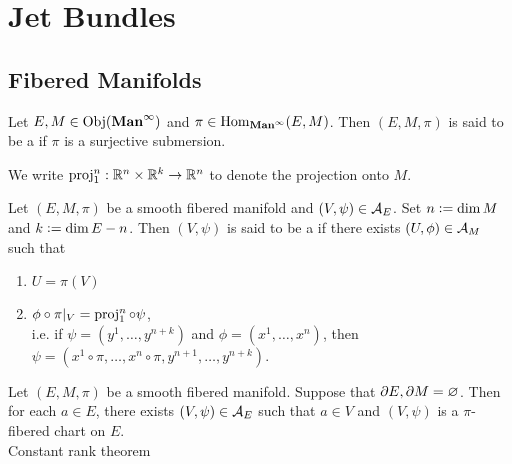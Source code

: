 \documentclass{book}
\begin{document}
\chapter{Jet Bundles}

\section{Fibered Manifolds}

\begin{defn} 
	Let $E, M \in \operatorname{Obj}(\operatorname*{\text{\textbf{Man}}^{\infty}})$ and $\pi \in \operatorname{Hom}_{\operatorname*{\text{\textbf{Man}}^{\infty}}}(E, M)$. Then $(E, M, \pi)$ is said to be a  if $\pi$ is a surjective submersion. 
\end{defn}

\begin{note}
	We write $\operatorname{\text{proj}}^n_1: \mathbb{R}^n \times \mathbb{R}^k \rightarrow \mathbb{R}^n$ to denote the projection onto $M$.
\end{note}

\begin{defn} 
	Let $(E, M, \pi)$ be a smooth fibered manifold and $(V, \psi) \in \mathcal{A}_{E}$. Set $n \vcentcolon= \dim M$ and $k \vcentcolon= \dim E - n$. Then $(V, \psi)$ is said to be a  if there exists $(U, \phi) \in \mathcal{A}_{M}$ such that 
	\begin{enumerate}
		\item $U = \pi(V)$
		\item $\phi \circ \pi|_V = \operatorname{\text{proj}}^n_1 \circ \psi$, \\
		i.e. if $\psi = (y^1, \ldots, y^{n+k})$ and $\phi = (x^1, \ldots, x^n)$, then $\psi = (x^1 \circ \pi, \ldots, x^n \circ \pi, y^{n+1}, \ldots, y^{n+k})$.
	\end{enumerate}
\end{defn}

\begin{ex} 
	Let $(E, M, \pi)$ be a smooth fibered manifold. Suppose that $\partial E, \partial M = \varnothing$. Then for each $a \in E$, there exists $(V, \psi) \in \mathcal{A}_E$ such that $a \in V$ and $(V, \psi)$ is a $\pi$-fibered chart on $E$. \\
	 Constant rank theorem 
\end{ex}
\end{document}
